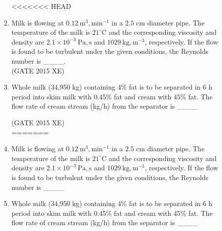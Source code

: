 \documentclass[journal,12pt,onecolumn]{IEEEtran}
\begin{document}
\begin{enumerate}
\begin{enumerate}
\begin{enumerate}
\begin{multicols}{2}
<<<<<<< HEAD
\end{multicols}


\item Milk is flowing at $0.12\ \mathrm{m^3,min^{-1}}$ in a $2.5$ cm diameter pipe. The temperature of the milk is $21^\circ$C and the corresponding viscosity and density are $2.1\times 10^{-3}\ \mathrm{Pa,s}$ and $1029\ \mathrm{kg,m^{-3}}$, respectively. If the flow is found to be turbulent under the given conditions, the Reynolds number is \_\_\_\_.\\
\hfill{(GATE 2015 XE)} 



\item Whole milk (34,950 kg) containing 4\% fat is to be separated in 6 h period into skim milk with 0.45\% fat and cream with 45\% fat. The flow rate of cream stream (kg/h) from the separator is \_\_\_\_

\hfill{(GATE 2015 XE)} \\

=======

\newpage

\item Milk is flowing at $0.12\ \mathrm{m^3,min^{-1}}$ in a $2.5$ cm diameter pipe. The temperature of the milk is $21^\circ$C and the corresponding viscosity and density are $2.1\times 10^{-3}\ \mathrm{Pa,s}$ and $1029\ \mathrm{kg,m^{-3}}$, respectively. If the flow is found to be turbulent under the given conditions, the Reynolds number is \_\_\_\_
\hfill{} \\

\vspace{0.5cm}

\item Whole milk (34,950 kg) containing 4\% fat is to be separated in 6 h period into skim milk with 0.45\% fat and cream with 45\% fat. The flow rate of cream stream (kg/h) from the separator is \_\_\_\_
\vspace{0.2cm}
\hfill{} \\


\end{enumerate}
\end{enumerate}
\end{enumerate}
\end{document}
